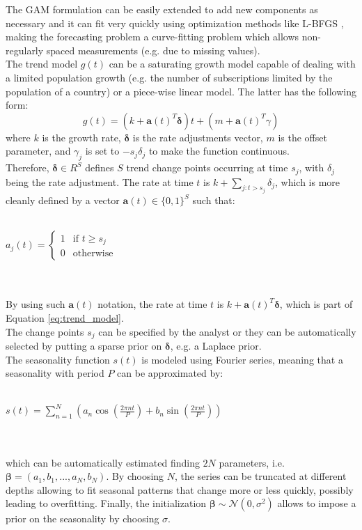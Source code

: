 \documentclass[a4paper, 12pt]{article} %
\begin{document}
	The GAM formulation can be easily extended to add new components as necessary and it can fit very quickly using optimization methods like L-BFGS \cite{L-BFGS}, making the forecasting problem a curve-fitting problem which allows non-regularly spaced measurements (e.g. due to missing values).\\
	The trend model $g(t)$ can be a saturating growth model capable of dealing with a limited population growth (e.g. the number of subscriptions limited by the population of a country) or a piece-wise linear model.
	The latter has the following form:
	\begin{equation} \label{eq:trend_model}
		g(t) = (k+\pmb{a}(t)^T\pmb{\delta})t + (m + \pmb{a}(t)^T\gamma)
	\end{equation}
	where $k$ is the growth rate, $\pmb{\delta}$ is the rate adjustments vector, $m$ is the offset parameter, and $\gamma_j$ is set to $-s_j\delta_j$ to make the function continuous.\\
	Therefore, $\pmb{\delta} \in \!R^S$ defines $S$ trend change points occurring at time $s_j$, with $\delta_j$ being the rate adjustment. The rate at time $t$ is $k+\sum_{j:t>s_j}\delta_j$, which is more cleanly defined by a vector $\pmb{a}(t) \in \{0,1\}^S$ such that:\\\\
	\centerline{
		$
		a_j(t) =
		\begin{cases}
			1 & \text{if $t \geq s_j$}\\
			0 & \text{otherwise}
		\end{cases}       
		$
	}\\\\
	By using such $\pmb{a}(t)$ notation, the rate at time $t$ is $k + \pmb{a}(t)^T\pmb{\delta}$, which is part of Equation \ref{eq:trend_model}. \\
	The change points $s_j$  can be specified by the analyst or they can be automatically selected by putting a sparse prior on $\pmb{\delta}$, e.g. a Laplace prior.\\
	The seasonality function $s(t)$ is modeled using Fourier series, meaning that a seasonality with period $P$ can be approximated by:\\\\
	\centerline{$s(t) = \sum_{n=1}^{N} (a_n \cos{(\frac{2\pi nt}{P})} + b_n \sin{(\frac{2\pi nt}{P})}) $}\\\\
	which can be automatically estimated finding $2N$ parameters, i.e.\\ $ \pmb{\beta} =  (a_1, b_1, ..., a_N, b_N)$. By choosing $N$, the series can be truncated at different depths allowing to fit seasonal patterns that change more or less quickly, possibly leading to overfitting. Finally, the initialization $\pmb{\beta} \sim \mathcal{N}(0, \sigma^2)$ allows to impose a prior on the seasonality by choosing $\sigma$. \\
\end{document}
